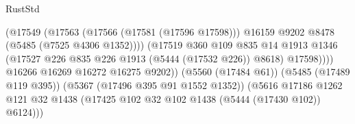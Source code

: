 \begin{lexlean}{RustStd}
\begin{coremodule}
                                                      (@17549
                                                        (@17563
                                                          (@17566 (@17581 (@17596 @17598)))
                                                          @16159
                                                          @9202
                                                          @8478
                                                          (@5485 (@7525 @4306 @1352))))
                                                      (@17519
                                                        @360
                                                        @109
                                                        @835
                                                        @14
                                                        @1913
                                                        @1346
                                                        (@17527
                                                          @226
                                                          @835
                                                          @226
                                                          @1913
                                                          (@5444 (@17532 @226))
                                                          @8618)
                                                        @17598))))
                                                @16266
                                                @16269
                                                @16272
                                                @16275
                                                @9202))
                                            (@5560 (@17484 @61))
                                            (@5485 (@17489 @119 @395))
                                            (@5367 (@17496 @395 @91 @1552 @1352))
                                            (@5616
                                              @17186
                                              @1262
                                              @121
                                              @32
                                              @1438
                                              (@17425
                                                @102
                                                @32
                                                @102
                                                @1438
                                                (@5444 (@17430 @102))
                                                @6124)))

\end{coremodule}
\end{lexlean}
